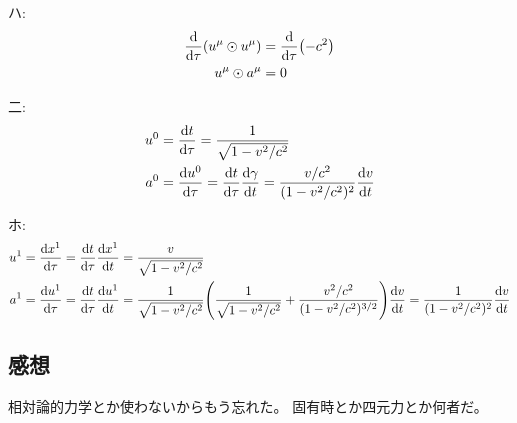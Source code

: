 \documentclass[../../sp_2015.tex]{subfiles}
\begin{document}
ハ:
\begin{equation}\begin{aligned}[b]
    \dv{\tau} (u^\mu\odot u^\mu) &= \dv{\tau}(-c^2)\\
        u^\mu\odot a^\mu &= 0
\end{aligned}\end{equation}

二:
\begin{equation}\begin{aligned}[b]
    u^0 &= \dv{t}{\tau} =\frac{1}{\sqrt{1-v^2/c^2}}\\
    a^0 &= \dv{u^0}{\tau} = \dv{t}{\tau}\dv{\gamma}{t}
        = \frac{v/c^2}{(1-v^2/c^2)^{2}}\dv{v}{t}
\end{aligned}\end{equation}

ホ:
\begin{equation}\begin{aligned}[b]
    u^1 &= \dv{x^1}{\tau} = \dv{t}{\tau}\dv{x^1}{t} = \frac{v}{\sqrt{1-v^2/c^2}}\\
    a^1 &= \dv{u^1}{\tau} = \dv{t}{\tau}\dv{u^1}{t}
        = \frac{1}{\sqrt{1-v^2/c^2}}\qty(\frac{1}{\sqrt{1-v^2/c^2}}+\frac{v^2/c^2}{(1-v^2/c^2)^{3/2}})\dv{v}{t}
        = \frac{1}{(1-v^2/c^2)^2}\dv{v}{t}
\end{aligned}\end{equation}



\subsection*{感想}
相対論的力学とか使わないからもう忘れた。
固有時とか四元力とか何者だ。
\end{document}

